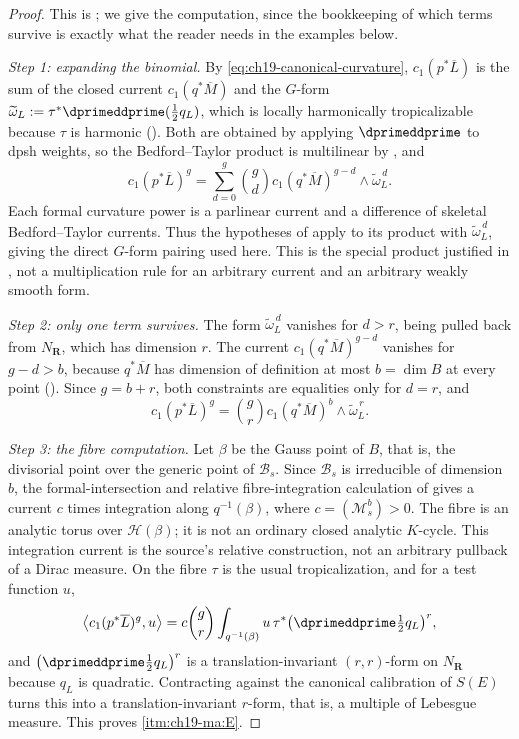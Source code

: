 \begin{proof}
This is \cite[Corollary~19.2.8]{CLD25}; we give the computation, since the
bookkeeping of which terms survive is exactly what the reader needs in the
examples below.

\emph{Step 1: expanding the binomial.}  By
\eqref{eq:ch19-canonical-curvature}, $c_1(p^*\overline L)$ is the sum of the
closed current $c_1(q^*\overline M)$ and the $G$-form
$\widetilde\omega_L:=\tau^*\dprimeddprime(\tfrac12q_L)$, which is locally
harmonically tropicalizable because $\tau$ is harmonic
().  Both are obtained by applying
$\dprimeddprime$ to dpsh weights, so the Bedford--Taylor product is
multilinear by , and
\[
 c_1(p^*\overline L)^g
 =\sum_{d=0}^{g}\binom{g}{d}
   c_1(q^*\overline M)^{g-d}\wedge\widetilde\omega_L^{\,d}.
\]
Each formal curvature power is a parlinear current and a difference of
skeletal Bedford--Taylor currents.  Thus the hypotheses of
 apply to its product with
$\widetilde\omega_L^{\,d}$, giving the direct $G$-form pairing used here.
This is the special product justified in \cite[Corollary~19.2.8]{CLD25},
not a multiplication rule for an arbitrary current and an arbitrary
weakly smooth form.

\emph{Step 2: only one term survives.}  The form
$\widetilde\omega_L^{\,d}$ vanishes for $d>r$, being pulled back from
$N_{\mathbf R}$, which has dimension $r$.  The current
$c_1(q^*\overline M)^{g-d}$ vanishes for $g-d>b$, because $q^*\overline M$
has dimension of definition at most $b=\dim B$ at every point
().  Since $g=b+r$, both constraints are
equalities only for $d=r$, and
\[
 c_1(p^*\overline L)^g
 =\binom{g}{r}c_1(q^*\overline M)^{b}\wedge\widetilde\omega_L^{\,r}.
\]

\emph{Step 3: the fibre computation.}  Let $\beta$ be the Gauss point of
$B$, that is, the divisorial point over the generic point of
$\mathcal B_s$.  Since $\mathcal B_s$ is irreducible of dimension $b$,
the formal-intersection and relative fibre-integration calculation of
\cite[Proposition~18.6.1 and Corollary~19.2.8]{CLD25} gives a current
$c$ times integration along $q^{-1}(\beta)$, where
$c=(\mathcal M_s^b)>0$.  The fibre is an analytic torus over
$\mathcal H(\beta)$; it is not an ordinary closed analytic $K$-cycle.
This integration current is the source's relative construction, not an
arbitrary pullback of a Dirac measure.  On the fibre $\tau$ is the usual
tropicalization, and for a test function $u$,
\[
 \bigl\langle c_1(p^*\overline L)^g,u\bigr\rangle
 =c\binom{g}{r}\int_{q^{-1}(\beta)}u\,\tau^*\bigl(\dprimeddprime\tfrac12q_L\bigr)^r ,
\]
and $\bigl(\dprimeddprime\tfrac12q_L\bigr)^r$ is a translation-invariant
$(r,r)$-form on $N_{\mathbf R}$ because $q_L$ is quadratic.  Contracting
against the canonical calibration of $S(E)$ turns this into a
translation-invariant $r$-form, that is, a multiple of Lebesgue measure.
This proves \cref{itm:ch19-ma:E}.


\end{proof}
